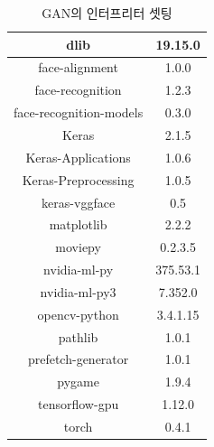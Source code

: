 \documentclass{oblivoir}
\begin{document}
\begin{table}[h!]
\centering
\begin{tabular}{|c|c|}
    \hline\hline
    dlib & 19.15.0 \\ \hline
    face-alignment & 1.0.0  \\ \hline
    face-recognition & 1.2.3  \\ \hline
    face-recognition-models & 0.3.0  \\ \hline
    Keras & 2.1.5  \\ \hline
    Keras-Applications & 1.0.6  \\ \hline
    Keras-Preprocessing & 1.0.5  \\ \hline
    keras-vggface  & 0.5  \\ \hline
    matplotlib & 2.2.2  \\ \hline
    moviepy & 0.2.3.5  \\ \hline
    nvidia-ml-py &  375.53.1  \\ \hline
    nvidia-ml-py3 &  7.352.0  \\ \hline
    opencv-python & 3.4.1.15  \\ \hline
    pathlib & 1.0.1 \\ \hline 
    prefetch-generator &  1.0.1  \\ \hline
    pygame & 1.9.4  \\ \hline
    tensorflow-gpu &  1.12.0  \\ \hline
    torch & 0.4.1  \\ \hline
    \hline\hline
\end{tabular}
\caption{GAN의 인터프리터 셋팅 }
\end{table}
\end{document}
